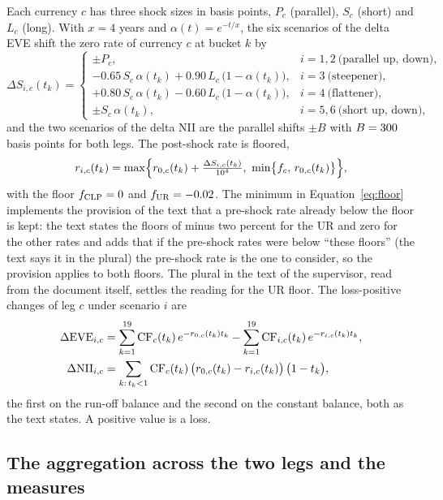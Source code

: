 Each currency $c$ has three shock sizes in basis points, $P_c$ (parallel), $S_c$ (short) and $L_c$ (long). With $x=4$ years and $\alpha(t)=e^{-t/x}$, the six scenarios of the delta EVE shift the zero rate of currency $c$ at bucket $k$ by
\begin{equation}
\Delta S_{i,c}(t_k)=\begin{cases}
\pm P_c, & i=1,2\ \text{(parallel up, down)},\\
-0.65\,S_c\,\alpha(t_k)+0.90\,L_c\,\bigl(1-\alpha(t_k)\bigr), & i=3\ \text{(steepener)},\\
+0.80\,S_c\,\alpha(t_k)-0.60\,L_c\,\bigl(1-\alpha(t_k)\bigr), & i=4\ \text{(flattener)},\\
\pm S_c\,\alpha(t_k), & i=5,6\ \text{(short up, down)},
\end{cases}
\label{eq:shocks}
\end{equation}
and the two scenarios of the delta NII are the parallel shifts $\pm B$ with $B=300$ basis points for both legs. The post-shock rate is floored,
\begin{equation}
r_{i,c}(t_k)=\max\Bigl\{r_{0,c}(t_k)+\tfrac{\Delta S_{i,c}(t_k)}{10^{4}},\ \min\bigl\{f_c,\,r_{0,c}(t_k)\bigr\}\Bigr\},
\label{eq:floor}
\end{equation}
with the floor $f_{\mathrm{CLP}}=0$ and $f_{\mathrm{UR}}=-0.02$. The minimum in Equation~\eqref{eq:floor} implements the provision of the text that a pre-shock rate already below the floor is kept: the text states the floors of minus two percent for the UR and zero for the other rates and adds that if the pre-shock rates were below ``these floors'' (the text says it in the plural) the pre-shock rate is the one to consider, so the provision applies to both floors. The plural in the text of the supervisor, read from the document itself, settles the reading for the UR floor. The loss-positive changes of leg $c$ under scenario $i$ are
\begin{align}
\Delta\mathrm{EVE}_{i,c}&=\sum_{k=1}^{19}\mathrm{CF}_{c}(t_k)\,e^{-r_{0,c}(t_k)t_k}-\sum_{k=1}^{19}\mathrm{CF}_{i,c}(t_k)\,e^{-r_{i,c}(t_k)t_k},\label{eq:deve}\\
\Delta\mathrm{NII}_{i,c}&=\sum_{k:\,t_k<1}\mathrm{CF}_{c}(t_k)\,\bigl(r_{0,c}(t_k)-r_{i,c}(t_k)\bigr)\,\bigl(1-t_k\bigr),\label{eq:dnii}
\end{align}
the first on the run-off balance and the second on the constant balance, both as the text states. A positive value is a loss.

\subsection{The aggregation across the two legs and the measures}
\label{sec:problem-aggregation}

